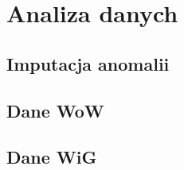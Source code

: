 \section{Analiza danych}
\label{section:analiza}

\subsection{Imputacja anomalii}
\label{subsection:imputacja}


\subsection{Dane WoW}
\label{subsection:dane-wow}


\subsection{Dane WiG}
\label{subsection:dane-wig}

